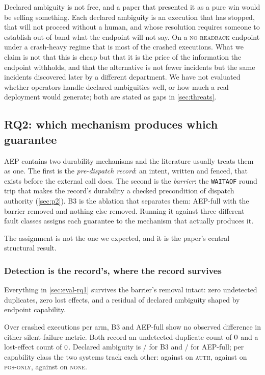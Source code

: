 Declared ambiguity is not free, and a paper that presented it as a pure win
would be selling something. Each declared ambiguity is an execution that has
stopped, that will not proceed without a human, and whose resolution requires
someone to establish out-of-band what the endpoint will not say. On a
\textsc{no-readback} endpoint under a crash-heavy regime that is most of the
crashed executions. What we claim is not that this is cheap but that it is
the price of the information the endpoint withholds, and that
the alternative is not fewer incidents but the same incidents discovered later
by a different department. We have not evaluated whether operators handle
declared ambiguities well, or how much a real deployment would generate; both
are stated as gaps in \cref{sec:threats}.

\subsection{RQ2: which mechanism produces which guarantee}
\label{sec:eval-rq2}

AEP contains two durability mechanisms and the literature usually treats them
as one. The first is the \emph{pre-dispatch record}: an intent, written and
fenced, that exists before the external call does. The second is the
\emph{barrier}: the \texttt{WAITAOF} round trip that makes the record's
durability a checked precondition of dispatch authority (\cref{sec:p2}). B3 is
the ablation that separates them: AEP-full with the barrier removed and
nothing else removed. Running it against three different fault classes
assigns each guarantee to the mechanism that actually produces it.

The assignment is not the one we expected, and it is the paper's central
structural result.

\subsubsection{Detection is the record's, where the record survives}
\label{sec:eval-detection}

Everything in \cref{sec:eval-rq1} survives the barrier's removal intact: zero
undetected duplicates, zero lost effects, and a residual of declared ambiguity
shaped by endpoint capability.



Over \BthreeVsAepN{} crashed executions per arm, B3 and AEP-full show no
observed difference in either silent-failure metric. Both record an
undetected-duplicate count of $0{}$ and a lost-effect count
of $0{}$. Declared ambiguity is
\BthreeAmbCount{}/\BthreeVsAepN{} for B3 and
\AepAmbCount{}/\BthreeVsAepN{} for AEP-full; per capability class the two
systems track each other: \BthreeAmbAuth{} against \AepAmbAuth{} on \textsc{auth},
\BthreeAmbPosOnly{} against \AepAmbPosOnly{} on \textsc{pos-only},
\BthreeAmbNoReadback{} against \AepAmbNoReadback{} on \textsc{none}.

